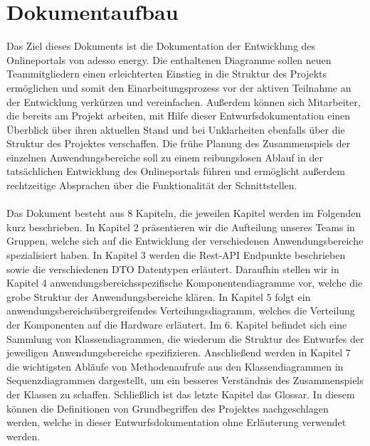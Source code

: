 \section{Dokumentaufbau}\label{sec:dokumentaufbau}
Das Ziel dieses Dokuments ist die Dokumentation der Entwicklung des Onlineportals von adesso energy. 
Die enthaltenen Diagramme sollen neuen Teammitgliedern einen erleichterten Einstieg in die Struktur des Projekts ermöglichen 
und somit den Einarbeitungsprozess vor der aktiven Teilnahme an der Entwicklung verkürzen und vereinfachen.  
Außerdem können sich Mitarbeiter, die bereits am Projekt arbeiten, mit Hilfe dieser Entwurfsdokumentation einen Überblick über 
ihren aktuellen Stand und bei Unklarheiten ebenfalls über die Struktur des Projektes verschaffen.
Die frühe Planung des Zusammenspiels der einzelnen Anwendungsbereiche soll zu einem reibungslosen Ablauf 
in der tatsächlichen Entwicklung des Onlineportals führen und ermöglicht außerdem rechtzeitige Absprachen über die Funktionalität 
der Schnittstellen.
\\\\
Das Dokument besteht aus 8 Kapiteln, die jeweilen Kapitel werden im Folgenden kurz beschrieben. In Kapitel 2 präsentieren wir die Aufteilung unseres Teams in Gruppen, welche sich auf die Entwicklung der verschiedenen Anwendungsbereiche spezialisiert haben. In Kapitel 3 werden die Rest-API Endpunkte beschrieben sowie die verschiedenen DTO Datentypen erläutert. Daraufhin stellen wir in Kapitel 4 anwendungsbereichsspezifische 
Komponentendiagramme vor, welche die grobe Struktur der Anwendungsbereiche klären.
In Kapitel 5 folgt ein anwendungsbereichsübergreifendes Verteilungsdiagramm, welches die Verteilung der Komponenten auf die Hardware erläutert. 
Im 6. Kapitel befindet sich eine Sammlung von Klassendiagrammen, die wiederum die Struktur des Entwurfes 
der jeweiligen Anwendungsbereiche spezifizieren. Anschließend werden in Kapitel 7 die wichtigsten Abläufe von Methodenaufrufe aus den Klassendiagrammen in Sequenzdiagrammen dargestellt, um ein besseres Verständnis 
des Zusammenspiels der Klassen zu schaffen. Schließlich ist das letzte Kapitel das Glossar. 
In diesem können die Definitionen von Grundbegriffen des Projektes nachgeschlagen werden, welche in 
dieser Entwurfsdokumentation ohne Erläuterung verwendet werden. \newpage

